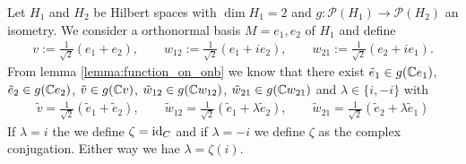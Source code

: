 \begin{example} \label{example:twodim}
	Let $H_1$ and $H_2$ be Hilbert spaces with $\dim H_1 = 2$ and $g: \mathcal{P}(H_1) \to \mathcal{P}(H_2)$ an isometry. We consider a orthonormal basis $M = {e_1, e_2}$ of $H_1$ and define
	\begin{align*}
		v := \frac{1}{\sqrt{2}}(e_1 + e_2), \qquad w_{12} := \frac{1}{\sqrt{2}}(e_1 + i e_2), \qquad  w_{21} := \frac{1}{\sqrt{2}}(e_2 + i e_1).
	\end{align*} 
	From lemma \ref{lemma:function_on_onb} we know that there exist $\tilde{e}_1 \in g(\mathbb{C} e_1)$, $\tilde{e}_2 \in g(\mathbb{C} e_2)$, $\tilde{v} \in g(\mathbb{C} v)$, $\tilde{w}_{12} \in g(\mathbb{C} w_{12})$, $\tilde{w}_{21} \in g(\mathbb{C} w_{21})$ and $\lambda \in \{i, -i\}$ with
	\begin{align*}
		\tilde{v} = \frac{1}{\sqrt{2}}(\tilde{e}_1 + \tilde{e}_2), \qquad \tilde{w}_{12} = \frac{1}{\sqrt{2}}(\tilde{e}_1 + \lambda \tilde{e}_2), \qquad \tilde{w}_{21} = \frac{1}{\sqrt{2}}(\tilde{e}_2 + \lambda \tilde{e}_1)
	\end{align*} 
	If $\lambda = i$ the we define $\zeta = \operatorname{id}_C$ and if $\lambda = -i$ we define $\zeta$ as the complex conjugation. Either way we hae $\lambda = \zeta(i)$.
	

\end{example}
